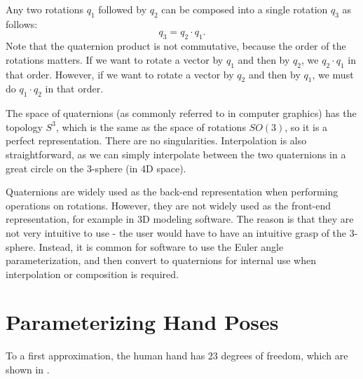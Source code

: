 Any two rotations $q_1$ followed by $q_2$ can be composed into a single rotation $q_3$ as follows:
\begin{equation}
\label{eqn:quat-composition}
    q_3 = q_2 \cdot q_1.
\end{equation}
Note that the quaternion product is not commutative, because the order of the rotations matters. If we want to rotate a vector by $q_1$ and then by $q_2$, we $q_2 \cdot q_1$ in that order. However, if we want to rotate a vector by $q_2$ and then by $q_1$, we must do $q_1 \cdot q_2$ in that order.

The space of quaternions (as commonly referred to in computer graphics) has the topology $S^3$, which is the same as the space of rotations $SO(3)$, so it is a perfect representation. There are no singularities. Interpolation is also straightforward, as we can simply interpolate between the two quaternions in a great circle on the 3-sphere (in 4D space).

Quaternions are widely used as the back-end representation when performing operations on rotations. However, they are not widely used as the front-end representation, for example in 3D modeling software. The reason is that they are not very intuitive to use - the user would have to have an intuitive grasp of the 3-sphere. Instead, it is common for software to use the Euler angle parameterization, and then convert to quaternions for internal use when interpolation or composition is required.

\section{Parameterizing Hand Poses}
\label{s:hand-config}

To a first approximation, the human hand has 23 degrees of freedom, which are shown in .


